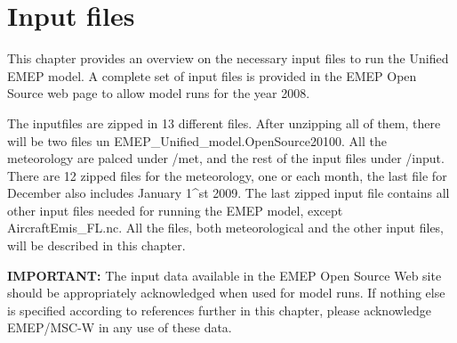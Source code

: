 \chapter{Input files}
\label{ch:InputFiles}

This chapter provides an overview on the necessary input files to run 
the Unified EMEP model. A complete set of input files is provided in
the EMEP Open Source web page to allow model runs for the year 2008. 

The inputfiles are zipped in 13 different files. After unzipping all of them, 
there will be two files un EMEP\_Unified_model.OpenSource20100. All the meteorology 
are palced under /met, and the rest of the input files under /input. 
There are 12 zipped files for the meteorology, one or each month, the last file for 
December also includes January 1{^st} 2009. The last zipped input file contains 
all other input files needed for running the EMEP model, except AircraftEmis_FL.nc. 
All the files, both meteorological and 
the other input files, will be described in this chapter.

{\bf IMPORTANT:} The input data available in the EMEP Open Source Web
site should be appropriately acknowledged when used for model runs.
If nothing else is specified according to references further in this
chapter, please acknowledge EMEP/MSC-W in
any use of these data.





